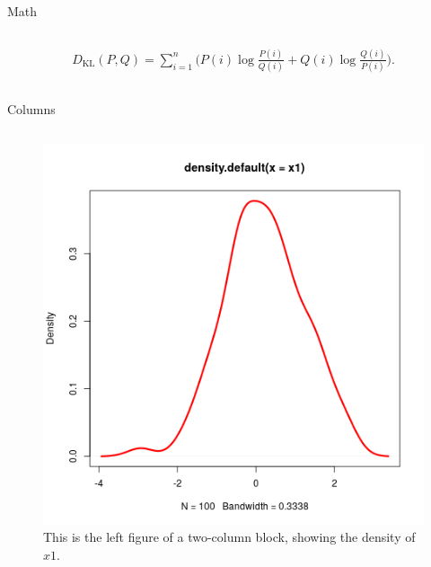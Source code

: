 \documentclass[final]{beamer}
\newcommand\sumin{\sum_{i=1}^{n}}
\newcommand{\Xoi}[1]{#1(i)}
\newcommand{\frakPQ}[2]{\frac{\Xoi{#1}}{\Xoi{#2}}}
\newcommand{\DKLPQ}[3]{D_{\mathrm{KL}}(#1 #3 #2)}
\begin{document}
\begin{frame}[fragile,label={sec:org2358f68}]{}
\begin{columns}
\begin{column}[t]{0.45\columnwidth}
\begin{block}{Math}
\begin{columns}
\begin{column}[T]{0.78\columnwidth}
\begin{align} 
\label{eq:KL2} 
\DKLPQ{P}{Q}{,} = \sumin \Big(\Xoi{P} \log \frakPQ{P}{Q} + \Xoi{Q} \log \frakPQ{Q}{P} \Big).
\end{align}
\end{column}
\end{columns}
\end{block}

\begin{block}{Columns}
\begin{columns}
\begin{column}[T]{0.48\columnwidth}
\captionsetup{justification=justified,width=.85\linewidth}
\begin{figure}[htbp]
\centering
\includegraphics[width=.9\linewidth]{4l.png}
\caption{\label{fig:org507781c}
This is the left figure of a two-column block, showing the density of \(x1\).}
\end{figure}
\end{column}


\end{columns}
\end{block}
\end{column}
\end{columns}
\end{frame}
\end{document}
